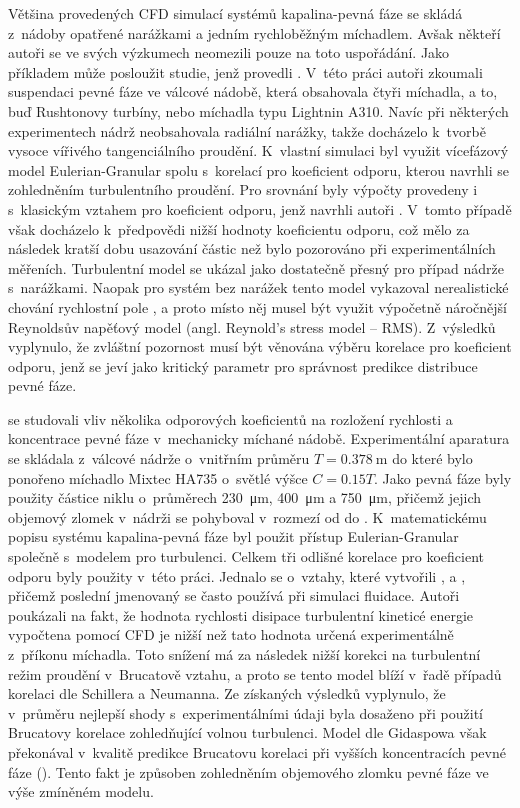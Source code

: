 Většina provedených CFD simulací systémů kapalina-pevná fáze se skládá z~nádoby opatřené narážkami a jedním rychloběžným míchadlem. Avšak někteří autoři se ve svých výzkumech neomezili pouze na toto uspořádání. Jako příkladem může posloužit studie, jenž provedli \citet{mon04}. V~této práci autoři zkoumali suspendaci pevné fáze ve válcové nádobě, která obsahovala čtyři míchadla, a to, buď Rushtonovy turbíny, nebo míchadla typu Lightnin A310. Navíc při některých experimentech nádrž neobsahovala radiální narážky, takže docházelo k~tvorbě vysoce vířivého tangenciálního proudění. K~vlastní simulaci byl využit vícefázový model Eulerian-Granular spolu s~korelací pro koeficient odporu, kterou navrhli \citet{pin01} se zohledněním turbulentního proudění. Pro srovnání byly výpočty provedeny i s~klasickým vztahem pro koeficient odporu, jenž navrhli autoři \citet{schi32}. V~tomto případě však docházelo k~předpovědi nižší hodnoty koeficientu odporu, což mělo za následek kratší dobu usazování částic než bylo pozorováno při experimentálních měřeních. Turbulentní model \keps{} se ukázal jako dostatečně přesný pro případ nádrže s~narážkami. Naopak pro systém bez narážek tento model vykazoval nerealistické chování rychlostní pole , a proto místo něj musel být využit výpočetně náročnější Reynoldsův napěťový model (angl. Reynold's stress model -- RMS). Z~výsledků vyplynulo, že zvláštní pozornost musí být věnována výběru korelace pro koeficient odporu, jenž se jeví jako kritický parametr pro správnost predikce distribuce pevné fáze.

\citet{ochi08} se studovali vliv několika odporových koeficientů na rozložení rychlosti a koncentrace pevné fáze v~mechanicky míchané nádobě. Experimentální aparatura se skládala z~válcové nádrže o~vnitřním průměru $T=\SI{0.378}{\meter}$ do které bylo ponořeno míchadlo Mixtec HA735 o~světlé výšce $C=\num{0.15}T$. Jako pevná fáze byly použity částice niklu o~průměrech \SI{230}{\micro\meter}, \SI{400}{\micro\meter} a \SI{750}{\micro\meter}, přičemž jejich objemový zlomek v~nádrži se pohyboval v~rozmezí od  do . K~matematickému popisu systému kapalina-pevná fáze byl použit přístup Eulerian-Granular společně s~modelem \keps{} pro turbulenci. Celkem tři odlišné korelace pro koeficient odporu byly použity v~této práci. Jednalo se o~vztahy, které vytvořili \citet{schi32}, \citet{bru98} a \citet{gid94}, přičemž poslední jmenovaný se často používá při simulaci fluidace. Autoři poukázali na fakt, že hodnota rychlosti disipace turbulentní kineticé energie vypočtena pomocí CFD je nižší než tato hodnota určená experimentálně z~příkonu míchadla. Toto snížení má za následek nižší korekci na turbulentní režim proudění v~Brucatově vztahu, a proto se tento model blíží v~řadě případů korelaci dle Schillera a Neumanna. Ze získaných výsledků vyplynulo, že v~průměru nejlepší shody s~experimentálními údaji byla dosaženo při použití Brucatovy korelace zohledňující volnou turbulenci. Model dle Gidaspowa však překonával v~kvalitě predikce Brucatovu korelaci při vyšších koncentracích pevné fáze (). Tento fakt je způsoben zohledněním objemového zlomku pevné fáze ve výše zmíněném modelu.

